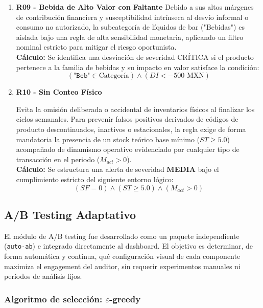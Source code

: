 \documentclass[11pt]{article}
\begin{document}
\begin{enumerate}
    \item \textbf{R09 - Bebida de Alto Valor con Faltante}
         Debido a sus altos márgenes de contribución financiera y susceptibilidad intrínseca al desvío informal o consumo no autorizado, la subcategoría de líquidos de bar ("Bebidas") es aislada bajo una regla de alta sensibilidad monetaria, aplicando un filtro nominal estricto para mitigar el riesgo oportunista.
         \\
        \textbf{Cálculo:}
        Se identifica una desviación de severidad CRÍTICA si el producto pertenece a la familia de bebidas y su impacto en valor satisface la condición:
        \[ (\texttt{"Beb"} \in \text{Categoría}) \land (DI < -500 \text{ MXN}) \]
    

    \item \textbf{R10 - Sin Conteo Físico}
    

         Evita la omisión deliberada o accidental de inventarios físicos al finalizar los ciclos semanales. Para prevenir falsos positivos derivados de códigos de producto descontinuados, inactivos o estacionales, la regla exige de forma mandatoria la presencia de un stock teórico base mínimo ($ST \ge 5.0$) acompañado de dinamismo operativo evidenciado por cualquier tipo de transacción en el periodo ($M_{act} > 0$).
         \\
        \textbf{Cálculo:}
        Se estructura una alerta de severidad \textbf{MEDIA} bajo el cumplimiento estricto del siguiente entorno lógico:
        \[ (SF = 0) \land (ST \ge 5.0) \land (M_{act} > 0) \]

\end{enumerate}


\subsection*{A/B Testing Adaptativo}

El módulo de A/B testing fue desarrollado como un paquete independiente (\texttt{auto-ab}) e integrado directamente al dashboard. El objetivo es determinar, de forma automática y continua, qué configuración visual de cada componente maximiza el engagement del auditor, sin requerir experimentos manuales ni períodos de análisis fijos.

\subsubsection*{Algoritmo de selección: \(\varepsilon\)-greedy}
\end{document}
